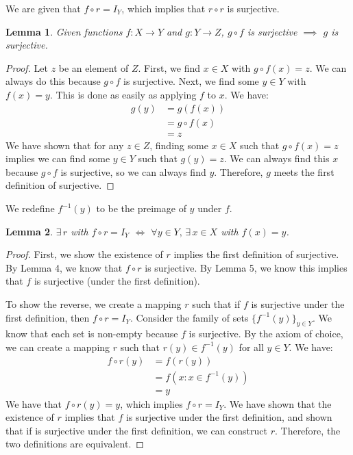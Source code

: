 \documentclass[12pt]{article}
\newtheorem{lemma}{Lemma}
\begin{document}
We are given that $f \circ r = I_Y$, which implies that $r \circ r$ is surjective.
\begin{lemma}
Given functions $f : X \rightarrow Y$ and $g : Y \rightarrow Z$,
$g \circ f$ is surjective $\implies$ $g$ is surjective.
\end{lemma}
\begin{proof}
Let $z$ be an element of $Z$. First, we find $x \in X$ with $g \circ f(x) = z$. We can always do this because $g \circ f$ is surjective. Next, we find some $y \in Y$ with $f(x) = y$. This is done as easily as applying $f$ to $x$. We have:
\begin{align*}
g(y) &= g(f(x))\\
&= g \circ f(x)\\
&= z
\end{align*}
We have shown that for any $z \in Z$, finding some $x \in X$ such that $g \circ f(x) = z$ implies we can find some $y \in Y$ such that $g(y) = z$. We can always find this $x$ because $g \circ f$ is surjective, so we can always find $y$. Therefore, $g$ meets the first definition of surjective.
\end{proof}

We redefine $f^{-1}(y)$ to be the preimage of $y$ under $f$.

\begin{lemma}
$\exists \, r$ with $f \circ r = I_Y$ $\iff$ $\forall y \in Y, \, \exists \, x \in X$ with $f(x) = y$.
\end{lemma}
\begin{proof}
First, we show the existence of $r$ implies the first definition of surjective. By Lemma 4, we know that $f \circ r$ is surjective. By Lemma 5, we know this implies that $f$ is surjective (under the first definition).

To show the reverse, we create a mapping $r$ such that if $f$ is surjective under the first definition, then $f \circ r = I_Y$. Consider the family of sets $\{f^{-1}(y)\}_{y \in Y}$. We know that each set is non-empty because $f$ is surjective. By the axiom of choice, we can create a mapping $r$ such that $r(y) \in f^{-1}(y)$ for all $y \in Y$. We have:
\begin{align*}
f \circ r(y) &= f(r(y))\\
&= f(x : x \in f^{-1}(y))\\
&= y
\end{align*}
We have that $f \circ r(y) = y$, which implies $f \circ r = I_Y$. We have shown that the existence of $r$ implies that $f$ is surjective under the first definition, and shown that if is surjective under the first definition, we can construct $r$. Therefore, the two definitions are equivalent.
\end{proof}
\end{document}
